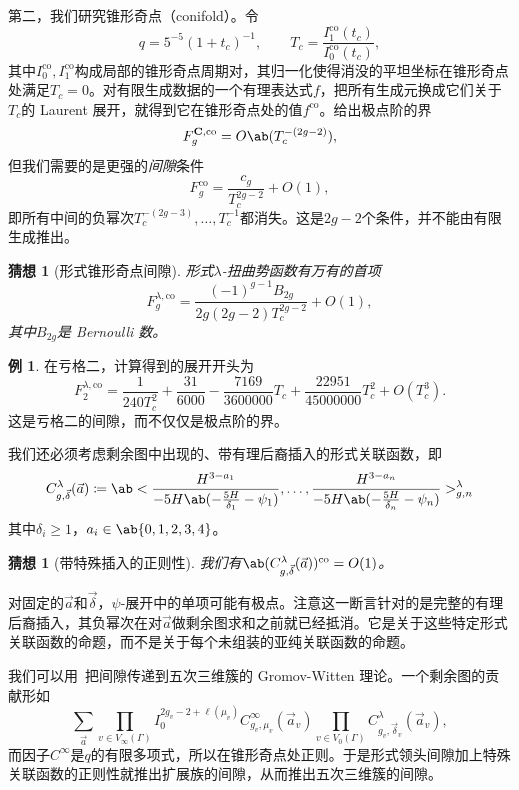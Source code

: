 \documentclass{amsart}
\newtheorem{conj}[thm]{猜想}
\theoremstyle{definition}
\newtheorem{exm}[thm]{例}
\theoremstyle{remark}
\theoremstyle{plain}
\theoremstyle{definition}
\theoremstyle{remark}
\newcommand{\mbf}[1]{\mathbf{#1}}
\newcommand{\mr}[1]{\mathrm{#1}}
\newcommand{\1}{\mathbf{1}}
\newcommand{\2}{\mathbf{2}}
\newcommand{\3}{\mathbf{3}}
\begin{document}
第二，我们研究锥形奇点（conifold）。令
\[ q = 5^{-5}(1+t_c)^{-1}, \qquad T_c = \frac{I_1^{\mr{co}}(t_c)}{I_0^{\mr{co}}(t_c)}, \]
其中\(I_0^{\mr{co}}, I_1^{\mr{co}}\)构成局部的锥形奇点周期对，其归一化使得消没的平坦坐标在锥形奇点处满足\(T_c = 0\)。对有限生成数据的一个有理表达式\(f\)，把所有生成元换成它们关于\(T_c\)的 Laurent 展开，就得到它在锥形奇点处的值\(f^{\mr{co}}\)。给出极点阶的界
\[ F_g^{\mbf{C},\mr{co}} = O\ab(T_c^{-(2g-2)}), \]
但我们需要的是更强的\textit{间隙}条件
\[ F_g^{\mr{co}} = \frac{c_g}{T_c^{2g-2}} + O(1), \]
即所有中间的负幂次\(T_c^{-(2g-3)}, \ldots, T_c^{-1}\)都消失。这是\(2g-2\)个条件，并不能由有限生成推出。

\begin{conj}[形式锥形奇点间隙]%
\label{conj:formal conifold gap}
    形式\(\lambda\)-扭曲势函数有万有的首项
    \[ F_g^{\lambda,\mr{co}} = \frac{(-1)^{g-1}B_{2g}}{2g(2g-2)T_c^{2g-2}} + O(1), \]
    其中\(B_{2g}\)是 Bernoulli 数。
\end{conj}

\begin{exm}
    在亏格二，计算得到的展开开头为
    \[ F_2^{\lambda,\mr{co}} = \frac{1}{240T_c^2} + \frac{31}{6000} - \frac{7169}{3600000}T_c + \frac{22951}{45000000}T_c^2 + O(T_c^3). \]
    这是亏格二的间隙，而不仅仅是极点阶的界。
\end{exm}

我们还必须考虑剩余图中出现的、带有理后裔插入的形式关联函数，即
\[ C^{\lambda}_{g,\vec{\delta}}(\vec{a}) \coloneqq \ab< \frac{H^{3-a_1}}{-5H\ab(-\frac{5H}{\delta_1}-\psi_1)}, \ldots, \frac{H^{3-a_n}}{-5H\ab(-\frac{5H}{\delta_n}-\psi_n)}>^{\lambda}_{g,n} \]
其中\(\delta_i \geq 1\)，\(a_i \in \ab\{0,1,2,3,4\}\)。

\begin{conj}[带特殊插入的正则性]%
\label{conj:special correlator regularity}
    我们有\(\ab(C^{\lambda}_{g,\vec{\delta}}(\vec{a}))^{\mr{co}} = O(1)\)。
\end{conj}

对固定的\(\vec{a}\)和\(\vec{\delta}\)，\(\psi\)-展开中的单项可能有极点。注意这一断言针对的是完整的有理后裔插入，其负幂次在对\(\vec{a}\)做剩余图求和之前就已经抵消。它是关于这些特定形式关联函数的命题，而不是关于每个未组装的亚纯关联函数的命题。

我们可以用~把间隙传递到五次三维簇的 Gromov-Witten 理论。一个剩余图的贡献形如
\[ \sum_{\vec{a}} \prod_{v \in V_{\infty}(\Gamma)}I_0^{2g_v-2+\ell(\mu_v)}C^{\infty}_{g_v,\mu_v}(\vec{a}_v)\prod_{v\in V_0(\Gamma)}C^{\lambda}_{g_v,\vec{\delta}_v}(\vec{a}_v), \]
而因子\(C^{\infty}\)是\(q\)的有限多项式，所以在锥形奇点处正则。于是形式领头间隙加上特殊关联函数的正则性就推出扩展族的间隙，从而推出五次三维簇的间隙。
\end{document}
